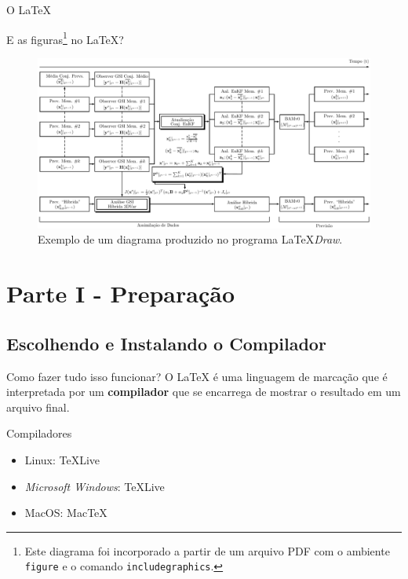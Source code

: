 \documentclass[10pt]{beamer}
\begin{document}
\begin{frame}{O \LaTeX{}}
	\begin{block}{E as figuras\footnote{{\scriptsize Este diagrama foi incorporado a partir de um arquivo PDF com o ambiente {\tt figure} e o comando {\tt includegraphics}.}} no \LaTeX{}?}
	    \vspace{-1em}
		\begin{figure}
				\includegraphics[width=\textwidth]{./figs/diagrama_hibrido_novo_pt-tempos.pdf}
				\caption{Exemplo de um diagrama produzido no programa \LaTeX\textit{Draw}.}
		\end{figure}
	\end{block}
\end{frame}

\section{Parte I - Preparação}

\subsection{Escolhendo e Instalando o Compilador}

\begin{frame}{Como fazer tudo isso funcionar?}
O \LaTeX{} é uma linguagem de marcação que é interpretada por um \textbf{compilador} que se encarrega de mostrar o resultado em um arquivo final.
    \pause
	\begin{block}{Compiladores}
		\begin{itemize}
			\item Linux: TeXLive
			\item \textit{Microsoft Windows}: TeXLive
			\item MacOS: MacTeX
		\end{itemize}
	\end{block}
\end{frame}
\end{document}
